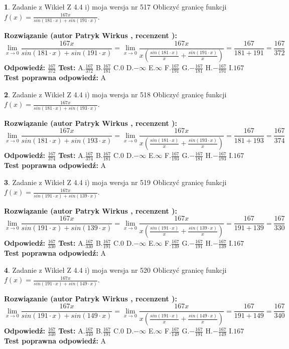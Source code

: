\documentclass[12pt, a4paper]{article}
\theoremstyle{definition} %
\newtheorem{zad}{}
\newcommand{\zadStart}[1]{\begin{zad}#1\newline}
\newcommand{\zadStop}{\end{zad}}
\newcommand{\rozwStart}[2]{\noindent \textbf{Rozwiązanie (autor #1 , recenzent #2): }\newline}
\newcommand{\rozwStop}{\newline}
\newcommand{\odpStart}{\noindent \textbf{Odpowiedź:}\newline}
\newcommand{\odpStop}{\newline}
\newcommand{\testStart}{\noindent \textbf{Test:}\newline}
\newcommand{\testStop}{\newline}
\newcommand{\kluczStart}{\noindent \textbf{Test poprawna odpowiedź:}\newline}
\newcommand{\kluczStop}{\newline}
\begin{document}
\zadStart{Zadanie z Wikieł Z 4.4 i) moja wersja nr 517}
Obliczyć granicę funkcji $f(x)=\frac{167x}{sin(181\cdot x) +sin(191\cdot x)}$.
\zadStop
\rozwStart{Patryk Wirkus}{}
$$\lim\limits_{x\to 0}\frac{167x}{sin(181\cdot x) +sin(191\cdot x)}=\lim\limits_{x\to 0}\frac{167x}{x(\frac{sin(181\cdot x)}{x}+\frac{sin(191\cdot x)}{x})}=\frac{167}{181+191} = \frac{167}{372}$$
\rozwStop
\odpStart
$\frac{167}{372}$
\odpStop
\testStart
A.$\frac{167}{372}$
B.$\frac{167}{181}$
C.$0$
D.$-\infty$
E.$\infty$
F.$\frac{167}{191}$
G.$-\frac{167}{181}$
H.$-\frac{167}{191}$
I.$167$
\testStop
\kluczStart
A
\kluczStop



\zadStart{Zadanie z Wikieł Z 4.4 i) moja wersja nr 518}
Obliczyć granicę funkcji $f(x)=\frac{167x}{sin(181\cdot x) +sin(193\cdot x)}$.
\zadStop
\rozwStart{Patryk Wirkus}{}
$$\lim\limits_{x\to 0}\frac{167x}{sin(181\cdot x) +sin(193\cdot x)}=\lim\limits_{x\to 0}\frac{167x}{x(\frac{sin(181\cdot x)}{x}+\frac{sin(193\cdot x)}{x})}=\frac{167}{181+193} = \frac{167}{374}$$
\rozwStop
\odpStart
$\frac{167}{374}$
\odpStop
\testStart
A.$\frac{167}{374}$
B.$\frac{167}{181}$
C.$0$
D.$-\infty$
E.$\infty$
F.$\frac{167}{193}$
G.$-\frac{167}{181}$
H.$-\frac{167}{193}$
I.$167$
\testStop
\kluczStart
A
\kluczStop



\zadStart{Zadanie z Wikieł Z 4.4 i) moja wersja nr 519}
Obliczyć granicę funkcji $f(x)=\frac{167x}{sin(191\cdot x) +sin(139\cdot x)}$.
\zadStop
\rozwStart{Patryk Wirkus}{}
$$\lim\limits_{x\to 0}\frac{167x}{sin(191\cdot x) +sin(139\cdot x)}=\lim\limits_{x\to 0}\frac{167x}{x(\frac{sin(191\cdot x)}{x}+\frac{sin(139\cdot x)}{x})}=\frac{167}{191+139} = \frac{167}{330}$$
\rozwStop
\odpStart
$\frac{167}{330}$
\odpStop
\testStart
A.$\frac{167}{330}$
B.$\frac{167}{191}$
C.$0$
D.$-\infty$
E.$\infty$
F.$\frac{167}{139}$
G.$-\frac{167}{191}$
H.$-\frac{167}{139}$
I.$167$
\testStop
\kluczStart
A
\kluczStop



\zadStart{Zadanie z Wikieł Z 4.4 i) moja wersja nr 520}
Obliczyć granicę funkcji $f(x)=\frac{167x}{sin(191\cdot x) +sin(149\cdot x)}$.
\zadStop
\rozwStart{Patryk Wirkus}{}
$$\lim\limits_{x\to 0}\frac{167x}{sin(191\cdot x) +sin(149\cdot x)}=\lim\limits_{x\to 0}\frac{167x}{x(\frac{sin(191\cdot x)}{x}+\frac{sin(149\cdot x)}{x})}=\frac{167}{191+149} = \frac{167}{340}$$
\rozwStop
\odpStart
$\frac{167}{340}$
\odpStop
\testStart
A.$\frac{167}{340}$
B.$\frac{167}{191}$
C.$0$
D.$-\infty$
E.$\infty$
F.$\frac{167}{149}$
G.$-\frac{167}{191}$
H.$-\frac{167}{149}$
I.$167$
\testStop
\kluczStart
A
\kluczStop
\end{document}
